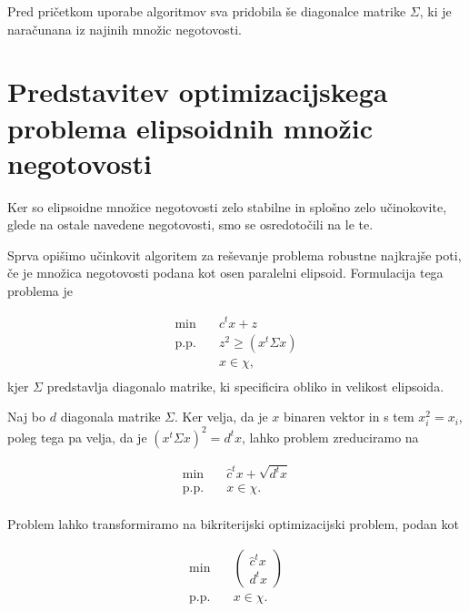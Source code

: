 \documentclass[a4paper, 12 pt]{article}
\theoremstyle{definition} %
\theoremstyle{plain} %
\theoremstyle{definition}
\begin{document}
Pred pričetkom uporabe algoritmov sva pridobila še diagonalce matrike $\Sigma$, ki je naračunana iz najinih množic negotovosti.


\section{Predstavitev optimizacijskega problema elipsoidnih množic negotovosti}
Ker so elipsoidne množice negotovosti zelo stabilne in splošno zelo učinokovite, glede na ostale navedene negotovosti, smo se osredotočili na le te.

Sprva opišimo učinkovit algoritem za reševanje problema robustne najkrajše poti, če je množica negotovosti podana kot osen paralelni elipsoid. Formulacija tega problema je

\begin{equation*}
\begin{aligned}
\min \quad &  \hat{c}^t x + z\\
\textrm{p.p.} \quad & {z}^2 \geq (x^t \Sigma x )\\
& x \in \chi,\\
\end{aligned}
\end{equation*}
 kjer $\Sigma$ predstavlja diagonalo matrike, ki specificira obliko in velikost elipsoida. \newline

Naj bo $d$ diagonala matrike $\Sigma$.
Ker velja, da je $x$ binaren vektor in s tem $x_{i}^2=x_{i}$, poleg tega pa velja, da je $(x^t  \Sigma x)^2 = d^tx$, lahko problem zreduciramo na

\begin{equation*}
\begin{aligned}
\min \quad &  \hat{c}^t x +\sqrt{d^tx}\\
\textrm{p.p.} \quad & x \in \chi.\\
\end{aligned}
\end{equation*}

Problem lahko transformiramo na bikriterijski optimizacijski problem, podan kot

\begin{equation*}
\begin{aligned}
\min \quad &  \begin{pmatrix} \hat{c}^t x \\ d^tx \end{pmatrix} \\
\textrm{p.p.} \quad & x \in \chi.\\
\end{aligned}
\end{equation*}
\end{document}
